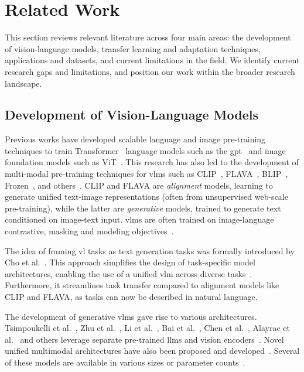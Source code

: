 \documentclass[../ShajiS_RnDReport.tex]{subfiles}
\begin{document}
\section{Related Work}
\label{sec:related_work}

This section reviews relevant literature across four main areas: the development of vision-language models, transfer learning and adaptation techniques, applications and datasets, and current limitations in the field. We identify current research gaps and limitations, and position our work within the broader research landscape.

\subsection{Development of Vision-Language Models}
Previous works have developed scalable language and image pre-training techniques to train Transformer~\cite{Vaswani2017} language models such as the \gls{gpt}~\cite{Radford2019,Brown2020} and image foundation models such as ViT~\cite{Dosovitskiy2021}. This research has also led to the development of multi-modal pre-training techniques for \glspl{vlm} such as CLIP~\cite{Radford2021}, FLAVA~\cite{Singh2021}, BLIP~\cite{Li2022}, Frozen~\cite{Tsimpoukelli2021}, and others~\cite{Zhou2024b}. CLIP and FLAVA are \emph{alignment} models, learning to generate unified text-image representations (often from unsupervised web-scale pre-training), while the latter are \emph{generative} models, trained to generate text conditioned on image-text input. \Glspl{vlm} are often trained on image-language contrastive, masking and modeling objectives~\cite{Li2022}.

The idea of framing \gls{vl} tasks as text generation tasks was formally introduced by Cho et al.~\cite{Cho2021}. This approach simplifies the design of task-specific model architectures, enabling the use of a unified \gls{vlm} across diverse tasks~\cite{Yuan2021,Alayrac2022,Xiao2023a}. Furthermore, it streamlines task transfer compared to alignment models like CLIP and FLAVA, as tasks can now be described in natural language.

The development of generative \glspl{vlm} gave rise to various architectures. Tsimpoukelli et al.~\cite{Tsimpoukelli2021}, Zhu et al.~\cite{Zhu2023}, Li et al.~\cite{Li2023}, Bai et al.~\cite{Bai2023}, Chen et al.~\cite{Chen2023}, Alayrac et al.~\cite{Alayrac2022} and others leverage separate pre-trained \glspl{llm} and vision encoders~\cite{Khan2022}. Novel unified multimodal architectures have also been proposed and developed~\cite{ChameleonTeam2024,Wang2022a}. Several of these models are available in various sizes or parameter counts~\cite{Liu2023a,ChameleonTeam2024}.
\end{document}
